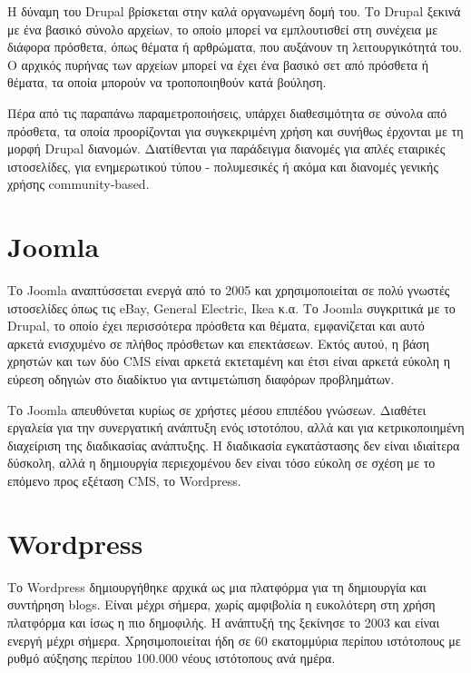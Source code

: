 \documentclass[12pt]{report}
\begin{document}
Η δύναμη του \textlatin{Drupal} βρίσκεται στην καλά οργανωμένη δομή του. Το \textlatin{Drupal} ξεκινά με ένα βασικό σύνολο αρχείων, το οποίο μπορεί να εμπλουτισθεί στη συνέχεια με διάφορα πρόσθετα, όπως θέματα ή αρθρώματα, που αυξάνουν τη λειτουργικότητά του. Ο αρχικός πυρήνας των αρχείων μπορεί να έχει ένα βασικό σετ από πρόσθετα ή θέματα, τα οποία μπορούν να τροποποιηθούν κατά βούληση.

Πέρα από τις παραπάνω παραμετροποιήσεις, υπάρχει διαθεσιμότητα σε σύνολα από πρόσθετα, τα οποία προορίζονται για συγκεκριμένη χρήση και συνήθως έρχονται με τη μορφή \textlatin{Drupal} διανομών. Διατίθενται για παράδειγμα διανομές για απλές εταιρικές ιστοσελίδες, για ενημερωτικού τύπου - πολυμεσικές ή ακόμα και διανομές γενικής χρήσης \textlatin{community-based}.

\section{\textlatin{Joomla}}
Το \textlatin{Joomla} αναπτύσσεται ενεργά από το 2005 και χρησιμοποιείται σε πολύ γνωστές ιστοσελίδες όπως τις \textlatin{eBay, General Electric, Ikea} κ.α. Το \textlatin{Joomla} συγκριτικά με το \textlatin{Drupal}, το οποίο έχει περισσότερα πρόσθετα και θέματα, εμφανίζεται και αυτό αρκετά ενισχυμένο σε πλήθος πρόσθετων και επεκτάσεων. Εκτός αυτού, η βάση χρηστών και των δύο \textlatin{CMS} είναι αρκετά εκτεταμένη και έτσι είναι αρκετά εύκολη η εύρεση οδηγιών στο διαδίκτυο για αντιμετώπιση διαφόρων προβλημάτων.

Το \textlatin{Joomla} απευθύνεται κυρίως σε χρήστες μέσου επιπέδου γνώσεων. Διαθέτει εργαλεία για την συνεργατική ανάπτυξη ενός ιστοτόπου, αλλά και για κετρικοποιημένη διαχείριση της διαδικασίας ανάπτυξης. Η διαδικασία εγκατάστασης δεν είναι ιδιαίτερα δύσκολη, αλλά η δημιουργία περιεχομένου δεν είναι τόσο εύκολη σε σχέση με το επόμενο προς εξέταση \textlatin{CMS}, το \textlatin{Wordpress}.

\section{\textlatin{Wordpress}}
Το \textlatin{Wordpress} δημιουργήθηκε αρχικά ως μια πλατφόρμα για τη δημιουργία και συντήρηση \textlatin{blogs}. Είναι μέχρι σήμερα, χωρίς αμφιβολία η ευκολότερη στη χρήση πλατφόρμα και ίσως η πιο δημοφιλής. Η ανάπτυξή της ξεκίνησε το 2003 και είναι ενεργή μέχρι σήμερα. Χρησιμοποιείται ήδη σε 60 εκατομμύρια περίπου ιστότοπους με ρυθμό αύξησης περίπου 100.000 νέους ιστότοπους ανά ημέρα.
\end{document}
